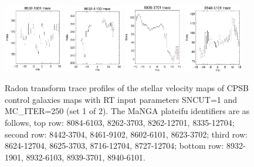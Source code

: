 \documentclass[fleqn,usenatbib]{mnras}
\begin{document}
\begin{figure}
    \includegraphics[width=0.23\textwidth]{Images/SN1-MC250/CPSB-CTRLs/8932-1901-1-250.png}
    \includegraphics[width=0.23\textwidth]{Images/SN1-MC250/CPSB-CTRLs/8932-6103-1-250.png}
    \includegraphics[width=0.23\textwidth]{Images/SN1-MC250/CPSB-CTRLs/8939-3701-1-250.png}
    \includegraphics[width=0.23\textwidth]{Images/SN1-MC250/CPSB-CTRLs/8940-6101-1-250.png}
    \caption{Radon transform trace profiles of the stellar velocity maps of CPSB control galaxies maps with RT input parameters SNCUT=1 and MC\_ITER=250 (set 1 of 2). The MaNGA plateifu identifiers are as follows, top row: 8084-6103, 8262-3703, 8262-12701, 8335-12704; second row: 8442-3704, 8461-9102, 8602-6101, 8623-3702; third row: 8624-12704, 8625-3703, 8716-12704, 8727-12704; bottom row: 8932-1901, 8932-6103, 8939-3701, 8940-6101.}
    \label{fig:Radon-traces-CPSB-controls-1-SN1-MC250}
\end{figure}
\end{document}
